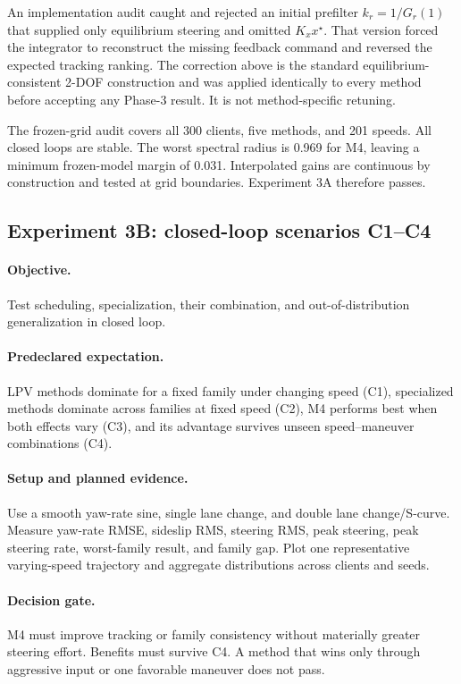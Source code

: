 An implementation audit caught and rejected an initial prefilter
$k_r=1/G_r(1)$ that supplied only equilibrium steering and omitted
$K_xx^\star$.  That version forced the integrator to reconstruct the missing
feedback command and reversed the expected tracking ranking.  The correction
above is the standard equilibrium-consistent 2-DOF construction and was applied
identically to every method before accepting any Phase-3 result.  It is not
method-specific retuning.

The frozen-grid audit covers all 300 clients, five methods, and 201 speeds.  All
closed loops are stable.  The worst spectral radius is 0.969 for M4, leaving a
minimum frozen-model margin of 0.031.  Interpolated gains are continuous by
construction and tested at grid boundaries.  Experiment 3A therefore passes.

\subsection{Experiment 3B: closed-loop scenarios C1--C4}
\paragraph{Objective.}
Test scheduling, specialization, their combination, and out-of-distribution
generalization in closed loop.

\paragraph{Predeclared expectation.}
LPV methods dominate for a fixed family under changing speed (C1), specialized
methods dominate across families at fixed speed (C2), M4 performs best when both
effects vary (C3), and its advantage survives unseen speed--maneuver combinations
(C4).

\paragraph{Setup and planned evidence.}
Use a smooth yaw-rate sine, single lane change, and double lane change/S-curve.
Measure yaw-rate RMSE, sideslip RMS, steering RMS, peak steering, peak steering
rate, worst-family result, and family gap. Plot one representative varying-speed
trajectory and aggregate distributions across clients and seeds.

\paragraph{Decision gate.}
M4 must improve tracking or family consistency without materially greater steering
effort. Benefits must survive C4. A method that wins only through aggressive input
or one favorable maneuver does not pass.

